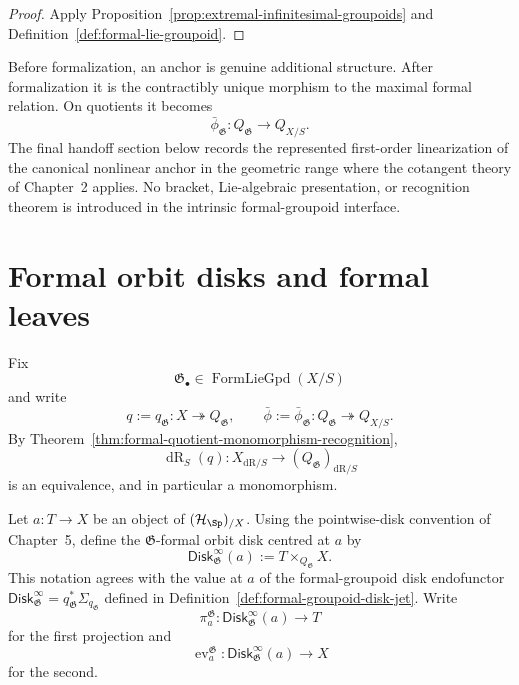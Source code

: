 \begin{proof}
Apply Proposition~\ref{prop:extremal-infinitesimal-groupoids} and
Definition~\ref{def:formal-lie-groupoid}.
\end{proof}

\begin{remark}
\label{rem:nonlinear-anchor}
Before formalization, an anchor is genuine additional structure.  After
formalization it is the contractibly unique morphism to the maximal formal
relation.  On quotients it becomes
\[
    \bar\phi_{\mathfrak G}:Q_{\mathfrak G}\to Q_{X/S}.
\]
The final handoff section below records the represented first-order
linearization of the canonical nonlinear anchor in the geometric range where
the cotangent theory of Chapter~2 applies.  No bracket,
Lie-algebraic presentation, or recognition theorem is introduced in the
intrinsic formal-groupoid interface.
\end{remark}


\section{Formal orbit disks and formal leaves}
\label{sec:flg-formal-disks}

Fix
\[
    \mathfrak G_\bullet
    \in
    \operatorname{FormLieGpd}(X/S)
\]
and write
\[
    q:=q_{\mathfrak G}:X\twoheadrightarrow Q_{\mathfrak G},
    \qquad
    \bar\phi:=\bar\phi_{\mathfrak G}:Q_{\mathfrak G}\twoheadrightarrow Q_{X/S}.
\]
By Theorem~\ref{thm:formal-quotient-monomorphism-recognition},
\[
    \operatorname{dR}_S(q):
    X_{\mathrm{dR}/S}
    \longrightarrow
    (Q_{\mathfrak G})_{\mathrm{dR}/S}
\]
is an equivalence, and in particular a monomorphism.

\begin{definition}
\label{def:formal-orbit-disk}
Let $a:T\to X$ be an object of $(\mathcal H_{\Sp})_{/X}$.  Using the
pointwise-disk convention of Chapter~5, define the
$\mathfrak G$-formal orbit disk centred at $a$ by
\[
    \mathsf{Disk}^{\infty}_{\mathfrak G}(a)
    :=
    T\times_{Q_{\mathfrak G}}X.
\]
This notation agrees with the value at \(a\) of the formal-groupoid disk
endofunctor
\(\mathsf{Disk}^{\infty}_{\mathfrak G}=q_{\mathfrak G}^*\Sigma_{q_{\mathfrak G}}\)
defined in Definition~\ref{def:formal-groupoid-disk-jet}.
Write
\[
    \pi^{\mathfrak G}_a:
    \mathsf{Disk}^{\infty}_{\mathfrak G}(a)\to T
\]
for the first projection and
\[
    \operatorname{ev}^{\mathfrak G}_a:
    \mathsf{Disk}^{\infty}_{\mathfrak G}(a)\to X
\]
for the second.
\end{definition}

